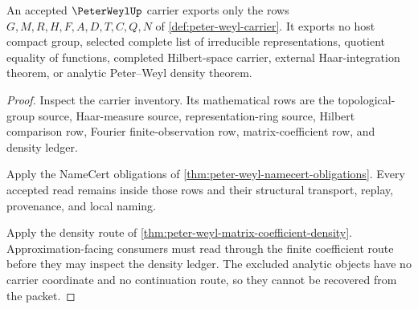\begin{theorem}
\label{thm:peter-weyl-nonescape}
An accepted $\PeterWeylUp$ carrier exports only the rows $G,M,R,H,F,A,D,T,C,Q,N$ of \autoref{def:peter-weyl-carrier}. It exports no host compact group, selected complete list of irreducible representations, quotient equality of functions, completed Hilbert-space carrier, external Haar-integration theorem, or analytic Peter--Weyl density theorem.
\end{theorem}
\begin{proof}
Inspect the carrier inventory. Its mathematical rows are the topological-group source, Haar-measure source, representation-ring source, Hilbert comparison row, Fourier finite-observation row, matrix-coefficient row, and density ledger.

Apply the NameCert obligations of \autoref{thm:peter-weyl-namecert-obligations}. Every accepted read remains inside those rows and their structural transport, replay, provenance, and local naming.

Apply the density route of \autoref{thm:peter-weyl-matrix-coefficient-density}. Approximation-facing consumers must read through the finite coefficient route before they may inspect the density ledger. The excluded analytic objects have no carrier coordinate and no continuation route, so they cannot be recovered from the packet.
\end{proof}




